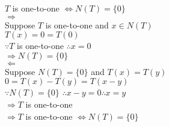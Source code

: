 $T$ is one-to-one $\iff N(T)= \{0\}$\\
$\Rightarrow$ \\
Suppose $T$ is one-to-one and $x \in N(T)$\\
$T(x) = 0 = T(0)$ \\
$\because T$ is one-to-one $\therefore x = 0$ \\
$\Rightarrow N(T) = \{0\}$ \\
$\Leftarrow$ \\
Suppose $N(T) = \{0\}$ and $T(x) = T(y)$ \\
$0 = T(x)- T(y) = T(x-y)$ \\
$\because N(T) = \{0\}$ $\therefore x-y = 0 \therefore x=y$ \\
$\Rightarrow T$ is one-to-one \\
$\Rightarrow T$ is one-to-one $\iff N(T)= \{0\}$

